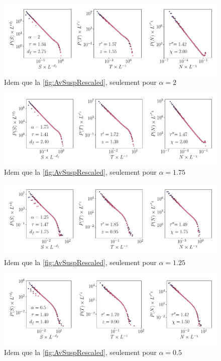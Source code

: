 \begin{figure}[h]
\centering
\includegraphics[width=\textwidth]{Chapitre3/Figures/Avalanches/Rescale_Av_alpha2.pdf}
\caption{Idem que la \autoref{fig:AvSuspRescaled}, seulement pour $\alpha=2$}
	\label{fig:annexAv2}
\end{figure}

\begin{figure}[h]
\centering
\includegraphics[width=\textwidth]{Chapitre3/Figures/Avalanches/Rescale_Av_alpha175.pdf}
\caption{Idem que la \autoref{fig:AvSuspRescaled}, seulement pour $\alpha=1.75$}
	\label{fig:annexAv3}
\end{figure}

\begin{figure}[h]
\centering
\includegraphics[width=\textwidth]{Chapitre3/Figures/Avalanches/Rescale_Av_alpha125.pdf}
\caption{Idem que la \autoref{fig:AvSuspRescaled}, seulement pour $\alpha=1.25$}
	\label{fig:annexAv4}
\end{figure}

\begin{figure}[h]
\centering
\includegraphics[width=\textwidth]{Chapitre3/Figures/Avalanches/Rescale_Av_alpha05.pdf}
\caption{Idem que la \autoref{fig:AvSuspRescaled}, seulement pour $\alpha=0.5$}
	\label{fig:annexAv5}
\end{figure}

